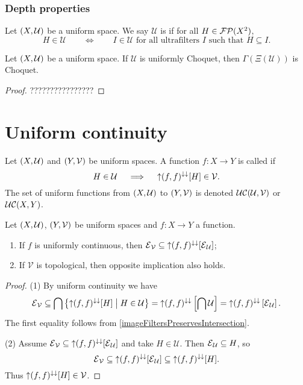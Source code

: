 \subsubsection{Depth properties}
\begin{definition}
Let $\left( X,\mathcal{U} \right)$ be a uniform space. We say $\mathcal{U}$ is  if for all $H\in \operatorname{\mathcal{FP}}(X^2)$,
\[ H\in\mathcal{U} \qquad\iff\qquad \text{$I \in \mathcal{U}$ for all ultrafilters $I$ such that $H\subseteq I$.} \]
\end{definition}

\begin{lemma}
Let $\left( X,\mathcal{U} \right)$ be a uniform space. If $\mathcal{U}$ is uniformly Choquet, then $\Gamma(\Xi(\mathcal{U}))$ is Choquet.
\end{lemma}
\begin{proof}
????????????????
\end{proof}

\section{Uniform continuity}
\begin{definition}
Let $\left( X,\mathcal{U} \right)$ and $\left( Y,\mathcal{V} \right)$ be uniform spaces. A function $f: X\to Y$ is called  if
\[ H\in \mathcal{U} \quad\implies\quad \operatorname{\uparrow} (f, f)^{\downarrow\downarrow}[H]\in \mathcal{V}. \]
The set of uniform functions from $\left( X,\mathcal{U} \right)$ to $\left( Y,\mathcal{V} \right)$ is denoted $\operatorname{\mathcal{UC}}(\mathcal{U}, \mathcal{V})$ or $\operatorname{\mathcal{UC}}(X,Y)$.
\end{definition}


\begin{proposition} \label{uniformContinuityEntourages}
Let $\left( X,\mathcal{U} \right)$, $\left( Y,\mathcal{V} \right)$ be uniform spaces and $f: X\to Y$ a function.
\begin{enumerate}
\item If $f$ is uniformly continuous, then $\operatorname{\mathcal{E}}_\mathcal{V} \subseteq \operatorname{\uparrow} (f, f)^{\downarrow\downarrow}[\operatorname{\mathcal{E}}_\mathcal{U}]$;
\item If $\mathcal{V}$ is topological, then opposite implication also holds.
\end{enumerate}
\end{proposition}
\begin{proof}
(1) By uniform continuity we have
\[ \operatorname{\mathcal{E}}_\mathcal{V} \subseteq \bigcap\left\{ \operatorname{\uparrow} (f, f)^{\downarrow\downarrow}[H] \;\middle|\; H\in \mathcal{U} \right\} = \operatorname{\uparrow} (f, f)^{\downarrow\downarrow}\left[\bigcap \mathcal{U}\right] = \operatorname{\uparrow} (f, f)^{\downarrow\downarrow}\left[\operatorname{\mathcal{E}}_\mathcal{U}\right]. \]
The first equality follows from \ref{imageFiltersPreservesIntersection}.

(2) Assume $\operatorname{\mathcal{E}}_\mathcal{V} \subseteq \operatorname{\uparrow} (f, f)^{\downarrow\downarrow}[\operatorname{\mathcal{E}}_\mathcal{U}]$ and take $H\in \mathcal{U}$. Then $\operatorname{\mathcal{E}}_\mathcal{U}\subseteq H$, so
\[ \operatorname{\mathcal{E}}_\mathcal{V} \subseteq \operatorname{\uparrow} (f, f)^{\downarrow\downarrow}[\operatorname{\mathcal{E}}_\mathcal{U}] \subseteq \operatorname{\uparrow} (f, f)^{\downarrow\downarrow}[H]. \]
Thus $\operatorname{\uparrow} (f, f)^{\downarrow\downarrow}[H] \in\mathcal{V}$.
\end{proof}


